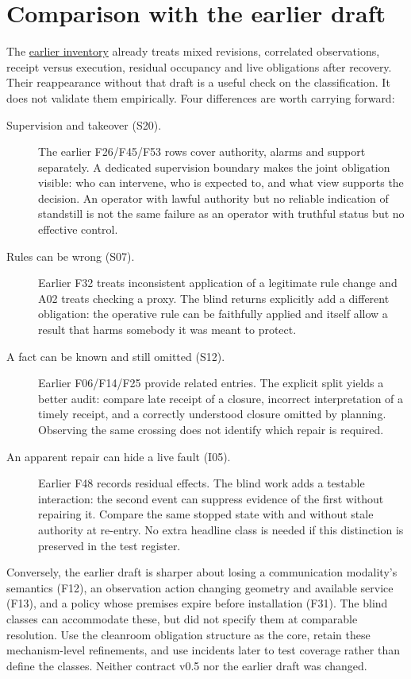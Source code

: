 \documentclass[11pt]{article}
\begin{document}
\section{Comparison with the earlier draft}
The \href{https://chatgpt.com/space/page_67998e48ab148191b64fd6759e583bff}{earlier inventory} already treats mixed revisions, correlated observations, receipt versus execution, residual occupancy and live obligations after recovery. Their reappearance without that draft is a useful check on the classification. It does not validate them empirically. Four differences are worth carrying forward:
\begin{description}
\item[Supervision and takeover (S20).] The earlier F26/F45/F53 rows cover authority, alarms and support separately. A dedicated supervision boundary makes the joint obligation visible: who can intervene, who is expected to, and what view supports the decision. An operator with lawful authority but no reliable indication of standstill is not the same failure as an operator with truthful status but no effective control.
\item[Rules can be wrong (S07).] Earlier F32 treats inconsistent application of a legitimate rule change and A02 treats checking a proxy. The blind returns explicitly add a different obligation: the operative rule can be faithfully applied and itself allow a result that harms somebody it was meant to protect.
\item[A fact can be known and still omitted (S12).] Earlier F06/F14/F25 provide related entries. The explicit split yields a better audit: compare late receipt of a closure, incorrect interpretation of a timely receipt, and a correctly understood closure omitted by planning. Observing the same crossing does not identify which repair is required.
\item[An apparent repair can hide a live fault (I05).] Earlier F48 records residual effects. The blind work adds a testable interaction: the second event can suppress evidence of the first without repairing it. Compare the same stopped state with and without stale authority at re-entry. No extra headline class is needed if this distinction is preserved in the test register.
\end{description}
Conversely, the earlier draft is sharper about losing a communication modality's semantics (F12), an observation action changing geometry and available service (F13), and a policy whose premises expire before installation (F31). The blind classes can accommodate these, but did not specify them at comparable resolution. Use the cleanroom obligation structure as the core, retain these mechanism-level refinements, and use incidents later to test coverage rather than define the classes. Neither contract v0.5 nor the earlier draft was changed.
\end{document}
